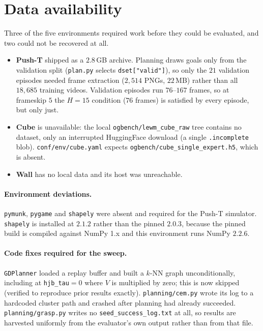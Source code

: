 \documentclass[11pt]{article}
\begin{document}
\section{Data availability}

Three of the five environments required work before they could be evaluated,
and two could not be recovered at all.

\begin{itemize}
  \item \textbf{Push-T} shipped as a $2.8$\,GB archive. Planning draws goals
        only from the validation split (\texttt{plan.py} selects
        \texttt{dset["valid"]}), so only the $21$ validation episodes needed
        frame extraction ($2{,}514$ PNGs, $22$\,MB) rather than all $18{,}685$
        training videos. Validation episodes run $76$--$167$ frames, so at
        frameskip $5$ the $H{=}15$ condition ($76$ frames) is satisfied by
        every episode, but only just.
  \item \textbf{Cube} is unavailable: the local
        \texttt{ogbench/lewm\_cube\_raw} tree contains no dataset, only an
        interrupted HuggingFace download (a single \texttt{.incomplete} blob).
        \texttt{conf/env/cube.yaml} expects
        \texttt{ogbench/cube\_single\_expert.h5}, which is absent.
  \item \textbf{Wall} has no local data and its host was unreachable.
\end{itemize}

\paragraph{Environment deviations.} \texttt{pymunk}, \texttt{pygame} and
\texttt{shapely} were absent and required for the Push-T simulator.
\texttt{shapely} is installed at $2.1.2$ rather than the pinned $2.0.3$,
because the pinned build is compiled against NumPy 1.x and this environment
runs NumPy $2.2.6$.

\paragraph{Code fixes required for the sweep.} \texttt{GDPlanner} loaded a
replay buffer and built a $k$-NN graph unconditionally, including at
\texttt{hjb\_tau}$=0$ where $V$ is multiplied by zero; this is now skipped
(verified to reproduce prior results exactly). \texttt{planning/cem.py} wrote
its log to a hardcoded cluster path and crashed after planning had already
succeeded. \texttt{planning/grasp.py} writes no
\texttt{seed\_success\_log.txt} at all, so results are harvested uniformly
from the evaluator's own output rather than from that file.
\end{document}
